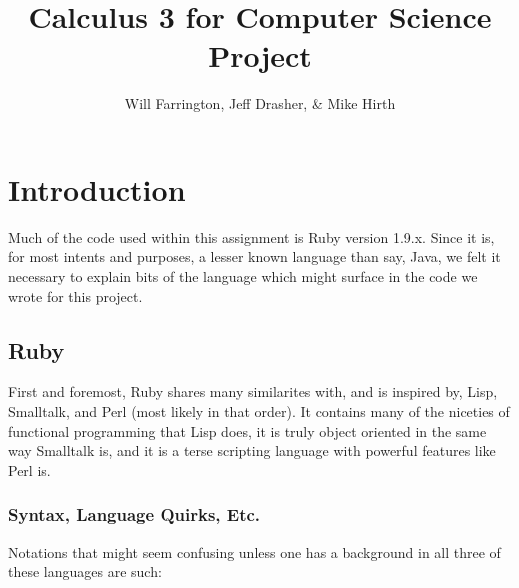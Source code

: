 \documentclass[letterpaper,12pt]{article}
\author{Will Farrington, Jeff Drasher, \& Mike Hirth}
\title{Calculus 3 for Computer Science Project}
\begin{document}
\maketitle
\tableofcontents
\newpage
\section{Introduction}

Much of the code used within this assignment is Ruby version 1.9.x.
Since it is, for most intents and purposes, a lesser known language than say,
Java, we felt it necessary to explain bits of the language which might surface
in the code we wrote for this project.

\subsection{Ruby}

First and foremost, Ruby shares many similarites with, and is inspired by, Lisp,
Smalltalk, and Perl (most likely in that order).
It contains many of the niceties of functional programming that Lisp does, it is
truly object oriented in the same way Smalltalk is, and it is a terse scripting
language with powerful features like Perl is.

\subsubsection{Syntax, Language Quirks, Etc.}

Notations that might seem confusing unless one has a background in all three of
these languages are such:
\end{document}
